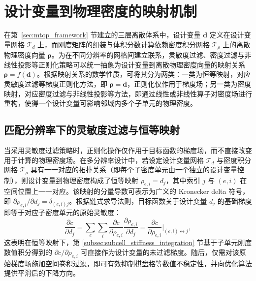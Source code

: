 \section{设计变量到物理密度的映射机制}
\label{sec:mapping}

在第~\ref{sec:mtop_framework} 节建立的三层离散体系中，设计变量 $\boldsymbol{d}$ 定义在设计变量网格 $\mathcal{T}_d$ 上，而刚度矩阵的组装与体积分数计算依赖密度积分网格 $\mathcal{T}_\rho$ 上的离散物理密度向量 $\boldsymbol{\rho}$。为在不同分辨率的网格间建立联系，灵敏度过滤、密度过滤与非线性投影等正则化策略可以统一抽象为设计变量到离散物理密度向量的映射关系 $\boldsymbol{\rho} = f(\boldsymbol{d})$。根据映射关系的数学性质，可将其分为两类：一类为恒等映射，对应灵敏度过滤等梯度正则化方法，即 $\boldsymbol{\rho} = \boldsymbol{d}$，正则化仅作用于梯度场；另一类为密度映射，对应密度过滤与非线性投影等方法，即通过线性或非线性算子对密度场进行重构，使得一个设计变量可影响邻域内多个子单元的物理密度。


\subsection{匹配分辨率下的灵敏度过滤与恒等映射}
\label{subsec:mapping-sens-identity}

当采用灵敏度过滤策略时，正则化操作仅作用于目标函数的梯度场，而不直接改变用于计算的物理密度场。在多分辨率设计中，若设定设计变量网格 $\mathcal{T}_d$ 与密度积分网格 $\mathcal{T}_\rho$ 具有一一对应的拓扑关系（即每个子密度单元由一个独立的设计变量控制），则设计变量到物理密度构成了恒等映射 $\rho_{e,i} = d_j$，其中索引 $j$ 与 $(e,i)$ 在空间位置上一一对应。该映射的分量导数可表示为广义的 Kronecker delta 符号，即 $\partial \rho_{e,i} / \partial d_j = \delta_{(e,i)j}$。根据链式求导法则，目标函数关于设计变量 $d_j$ 的基础梯度即等于对应子密度单元的原始灵敏度：
\[
\frac{\partial c}{\partial d_j} = \sum_{e}\sum_{i}\frac{\partial c}{\partial \rho_{e,i}} \frac{\partial \rho_{e,i}}{\partial d_j} = \frac{\partial c}{\partial \rho_{e,i}}\Bigg|_{(e,i) \leftrightarrow j},
\]
这表明在恒等映射下，第 \ref{subsec:subcell_stiffness_integration} 节基于子单元刚度数值积分得到的 $\partial c/\partial \rho_{e,i}$ 可直接作为设计变量的未过滤梯度。随后，仅需对该原始梯度场施加空间卷积过滤，即可有效抑制棋盘格等数值不稳定性，并向优化算法提供平滑后的下降方向。

